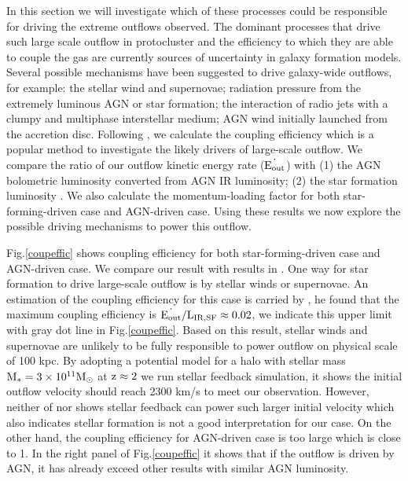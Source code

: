 \documentclass{subfiles}
\begin{document}
	In this section we will investigate which of these processes could be responsible for driving the extreme outflows observed. The dominant processes that drive such large scale outflow in protocluster and the efficiency to which they are able to couple the gas are currently sources of uncertainty in galaxy formation models. Several possible mechanisms have been suggested to drive galaxy-wide outflows, for example: the stellar wind and supernovae; radiation pressure from the extremely luminous AGN or star formation; the interaction of radio jets with a clumpy and multiphase interstellar medium; AGN wind initially launched from the accretion disc. Following \citet{harrison2014kiloparsec}, we calculate the coupling efficiency which is a popular method to investigate the likely drivers of large-scale outflow. We compare the ratio of our outflow kinetic energy rate ($\rm \dot{E_{out}}$) with (1) the AGN bolometric luminosity converted from AGN IR luminosity; (2) the star formation luminosity \citep{arrigoni2018overdensity}. We also calculate the momentum-loading factor for both star-forming-driven case and AGN-driven case. Using these results we now explore the possible driving mechanisms to power this outflow. 
	 
	 Fig.\ref{coupeffic} shows coupling efficiency for both star-forming-driven case and AGN-driven case. We compare our result with results in \citet{harrison2014kiloparsec}. One way for star formation to drive large-scale outflow is by stellar winds or supernovae. An estimation of the coupling efficiency for this case is carried by \citet{kennicutt1998star}, he found that the maximum coupling efficiency is $\rm \dot{E_{out}}/L_{IR,SF} \approx 0.02$, we indicate this upper limit with gray dot line in Fig.\ref{coupeffic}. Based on this result, stellar winds and supernovae are unlikely to be fully responsible to power outflow on physical scale of 100 kpc. By adopting a potential model for a halo with stellar mass $\rm M_{*}=3 \times 10^{11} M_{\odot}$ at $\rm z \approx 2$ we run stellar feedback simulation, it shows the initial outflow velocity should reach 2300 km/s to meet our observation. However, neither of \citet{Heckman2016The} nor \citet{Li_2020} shows stellar feedback can power such larger initial velocity which also indicates stellar formation is not a good interpretation for our case. On the other hand, the coupling efficiency for AGN-driven case is too large which is close to 1. In the right panel of Fig.\ref{coupeffic} it shows that if the outflow is driven by AGN, it has already exceed other results with similar AGN luminosity. 
	 
\end{document}
